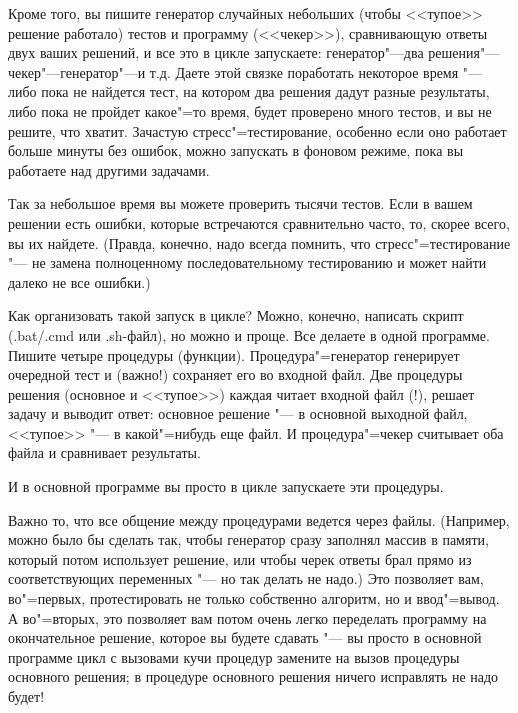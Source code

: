 \documentclass[a4paper,10pt]{problems}
\begin{document}
Кроме того, вы пишите генератор случайных небольших (чтобы <<тупое>> решение работало) тестов и программу (<<чекер>>), сравнивающую ответы двух ваших решений,
и все это в цикле запускаете: генератор"---два решения"---чекер"---генератор"---и т.д. 
Даете этой связке поработать некоторое время "--- либо пока не найдется тест, на котором два решения дадут разные результаты,
либо пока не пройдет какое"=то время, будет проверено много тестов, и вы не решите, что хватит.  
Зачастую стресс"=тестирование, особенно если оно работает больше минуты без ошибок, можно запускать в фоновом режиме, пока вы работаете над другими задачами.

Так за небольшое время вы можете проверить тысячи тестов. 
Если в вашем решении есть ошибки, которые встречаются сравнительно часто, то, скорее всего, вы их найдете.
(Правда, конечно, надо всегда помнить, что стресс"=тестирование "--- не замена полноценному последовательному тестированию и может найти далеко не все ошибки.)

Как организовать такой запуск в цикле? 
Можно, конечно, написать скрипт (.bat/.cmd или .sh-файл), но можно и проще. 
Все делаете в одной программе. Пишите четыре процедуры (функции). 
Процедура"=генератор генерирует очередной тест и (важно!) сохраняет его во входной файл.
Две процедуры решения (основное и <<тупое>>) каждая читает входной файл (!), решает задачу и выводит ответ: основное решение "--- в основной выходной файл,
<<тупое>> "--- в какой"=нибудь еще файл.
И процедура"=чекер считывает оба файла и сравнивает результаты.

И в основной программе вы просто в цикле запускаете эти процедуры.

Важно то, что все общение между процедурами ведется через файлы. 
(Например, можно было бы сделать так, чтобы генератор сразу заполнял массив в памяти, который потом использует решение,
или чтобы черек ответы брал прямо из соответствующих переменных "--- но так делать не надо.)
Это позволяет вам, во"=первых, протестировать не только собственно алгоритм, но и ввод"=вывод.
А во"=вторых, это позволяет вам потом очень легко переделать программу на окончательное решение, которое вы будете сдавать "---
вы просто в основной программе цикл с вызовами кучи процедур замените на вызов процедуры основного решения; 
в процедуре основного решения ничего исправлять не надо будет!
\end{document}
